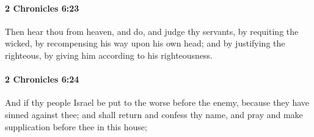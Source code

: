 		\paragraph{2 Chronicles 6:23} %
			\label{2CHRONICLES-6-23}

			Then hear thou from heaven, and do, and judge thy servants, by requiting the wicked, by recompensing his way upon his own head; and by justifying the righteous, by giving him according to his righteousness.


		\paragraph{2 Chronicles 6:24} %
			\label{2CHRONICLES-6-24}

			And if thy people Israel be put to the worse before the enemy, because they have sinned against thee; and shall return and confess thy name, and pray and make supplication before thee in this house;

